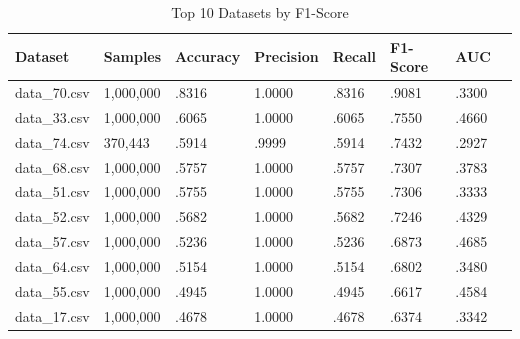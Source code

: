 \documentclass[pdflatex,sn-mathphys-num]{sn-jnl}
\theoremstyle{thmstyleone}%
\theoremstyle{thmstyletwo}%
\theoremstyle{thmstylethree}%
\begin{document}
\begin{table}[htbp]
\centering
\small
\caption{Top 10 Datasets by F1-Score}
\label{Top10DatasetsByF1}

\renewcommand{\arraystretch}{1.0}
\setlength{\tabcolsep}{4pt}
\begin{tabular}{@{}p{1.8cm}p{1.6cm}p{1.4cm}p{1.2cm}p{1.1cm}p{1.3cm}p{1.3cm}p{1.2cm}@{}}
\toprule
\textbf{Dataset} 
& \textbf{Samples}
& \textbf{Accuracy}
& \textbf{Precision}
& \textbf{Recall}
& \textbf{F1-Score}
& \textbf{AUC} \\
\midrule


data\_70.csv & 1,000,000 & .8316 & 1.0000 & .8316 & .9081 & .3300 \\
data\_33.csv & 1,000,000 & .6065 & 1.0000 & .6065 & .7550 & .4660 \\
data\_74.csv & 370,443   & .5914 & .9999 & .5914  & .7432 & .2927 \\
data\_68.csv & 1,000,000 & .5757 & 1.0000 & .5757 & .7307 & .3783 \\
data\_51.csv & 1,000,000 & .5755 & 1.0000 & .5755 & .7306 & .3333 \\
data\_52.csv & 1,000,000 & .5682 & 1.0000 & .5682 & .7246 & .4329 \\
data\_57.csv & 1,000,000 & .5236 & 1.0000 & .5236 & .6873 & .4685 \\
data\_64.csv & 1,000,000 & .5154 & 1.0000 & .5154 & .6802 & .3480 \\
data\_55.csv & 1,000,000 & .4945 & 1.0000 & .4945 & .6617 & .4584 \\
data\_17.csv & 1,000,000 & .4678 & 1.0000 & .4678 & .6374 & .3342 \\

\bottomrule
\end{tabular}
\end{table}
\end{document}
